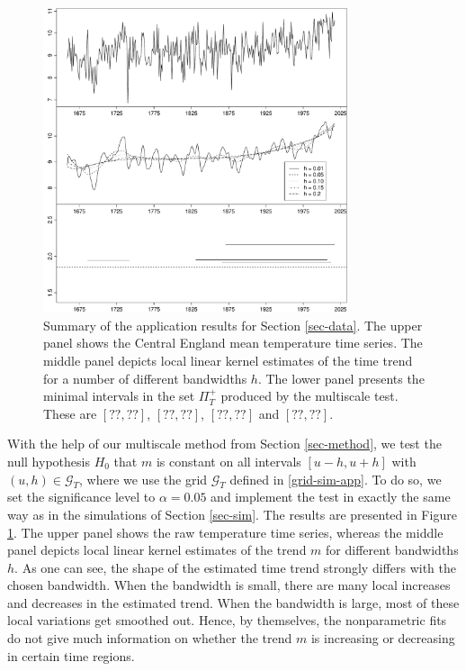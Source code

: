 \begin{figure}[t]
\centering
\includegraphics[width=0.8\textwidth]{Plots/temperature_L1_20_L2_30.pdf}
\caption{Summary of the application results for Section \ref{sec-data}. The upper panel shows the Central England mean temperature time series. The middle panel depicts local linear kernel estimates of the time trend for a number of different bandwidths $h$. The lower panel presents the minimal intervals in the set $\Pi_T^+$ produced by the multiscale test. These are $[??,??]$, $[??,??]$, $[??,??]$ and $[??,??]$.}\label{plot-results-app1}
\end{figure}


With the help of our multiscale method from Section \ref{sec-method}, we test the null hypothesis $H_0$ that $m$ is constant on all intervals $[u-h,u+h]$ with $(u,h) \in \mathcal{G}_T$, where we use the grid $\mathcal{G}_T$ defined in \eqref{grid-sim-app}. To do so, we set the significance level to $\alpha = 0.05$ and implement the test in exactly the same way as in the simulations of Section \ref{sec-sim}. The results are presented in Figure \ref{plot-results-app1}. The upper panel shows the raw temperature time series, whereas the middle panel depicts local linear kernel estimates of the trend $m$ for different bandwidths $h$. As one can see, the shape of the estimated time trend strongly differs with the chosen bandwidth. When the bandwidth is small, there are many local increases and decreases in the estimated trend. When the bandwidth is large, most of these local variations get smoothed out. Hence, by themselves, the nonparametric fits do not give much information on whether the trend $m$ is increasing or decreasing in certain time regions. 


